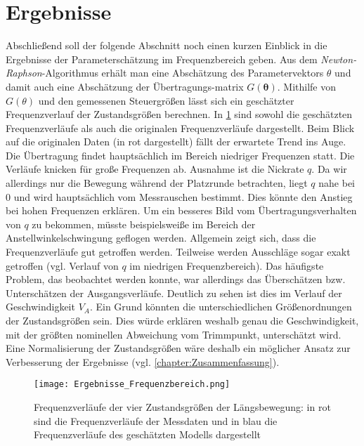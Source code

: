 \section{Ergebnisse}
Abschließend soll der folgende Abschnitt noch einen kurzen Einblick in die Ergebnisse der Parameterschätzung im 
Frequenzbereich geben. Aus dem \textit{Newton-Raphson}-Algorithmus erhält man eine Abschätzung des Parametervektors $\theta$ 
und damit auch eine Abschätzung der Übertragungs-matrix $G\mathbf{(\theta)}$. Mithilfe von $G(\theta)$ und den gemessenen 
Steuergrößen lässt sich ein geschätzter Frequenzverlauf der Zustandsgrößen berechnen.
In \cref{fig:Ergebnisse_f} sind sowohl die geschätzten Frequenzverläufe als auch die originalen 
Frequenzverläufe dargestellt. Beim Blick auf die originalen Daten (in rot dargestellt) fällt der erwartete Trend ins Auge. 
Die Übertragung findet hauptsächlich im Bereich niedriger Frequenzen statt. Die Verläufe knicken für große Frequenzen ab. 
Ausnahme ist die Nickrate $q$. Da wir allerdings nur die Bewegung während der Platzrunde betrachten, liegt $q$ nahe bei $ 0 $ 
und wird hauptsächlich vom Messrauschen bestimmt. Dies könnte den Anstieg bei hohen Frequenzen erklären. Um ein besseres Bild 
vom Übertragungsverhalten von $q$ zu bekommen, müsste beispielsweiße im Bereich der Anstellwinkelschwingung geflogen werden. 
Allgemein zeigt sich, dass die Frequenzverläufe gut getroffen werden. Teilweise werden Ausschläge sogar exakt 
getroffen (vgl. Verlauf von $q$ im niedrigen Frequenzbereich). Das häufigste Problem, das beobachtet werden konnte, war 
allerdings das Überschätzen bzw. Unterschätzen der Ausgangsverläufe. Deutlich zu sehen ist dies im Verlauf der 
Geschwindigkeit $V_{A}$. Ein Grund könnten die unterschiedlichen Größenordnungen der Zustandsgrößen sein. Dies würde erklären 
weshalb genau die Geschwindigkeit, mit der größten nominellen Abweichung vom Trimmpunkt, unterschätzt wird. Eine 
Normalisierung der Zustandsgrößen wäre deshalb ein möglicher Ansatz zur Verbesserung der Ergebnisse (vgl. 
\cref{chapter:Zusammenfassung}). 

\begin{figure}[h!]
	\centering
	\texttt{[image: Ergebnisse\_Frequenzbereich.png]}
	\caption{Frequenzverläufe der vier Zustandsgrößen der Längsbewegung: in rot sind die Frequenzverläufe der Messdaten und 
	in blau die Frequenzverläufe des geschätzten Modells dargestellt}
	\label{fig:Ergebnisse_f}
\end{figure}

